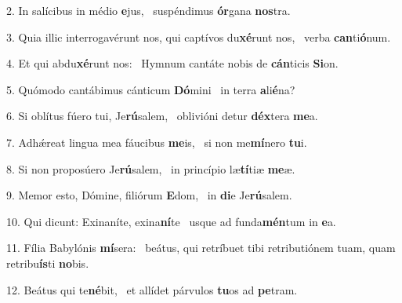 2. In salícibus in médio \textbf{e}jus, \ast\  suspéndimus \textbf{ór}gana \textbf{nos}tra.\

3. Quia illic interrogavérunt nos, qui captívos du\textbf{xé}runt nos, \ast\  verba \textbf{can}ti\textbf{ó}num.\

4. Et qui abdu\textbf{xé}runt nos: \ast\  Hymnum cantáte nobis de \textbf{cán}ticis \textbf{Si}on.\

5. Quómodo cantábimus cánticum \textbf{Dó}mini \ast\  in terra \textbf{a}li\textbf{é}na?\

6. Si oblítus fúero tui, Je\textbf{rú}salem, \ast\  oblivióni detur \textbf{déx}tera \textbf{me}a.\

7. Adhǽreat lingua mea fáucibus \textbf{me}is, \ast\  si non me\textbf{mí}nero \textbf{tu}i.\

8. Si non proposúero Je\textbf{rú}salem, \ast\  in princípio læ\textbf{tí}tiæ \textbf{me}æ.\

9. Memor esto, Dómine, filiórum \textbf{E}dom, \ast\  in \textbf{di}e Je\textbf{rú}salem.\

10. Qui dicunt: Exinaníte, exina\textbf{ní}te \ast\  usque ad funda\textbf{mén}tum in \textbf{e}a.\

11. Fília Babylónis \textbf{mí}sera: \ast\  beátus, qui retríbuet tibi retributiónem tuam, quam retribu\textbf{ís}ti \textbf{no}bis.\

12. Beátus qui te\textbf{né}bit, \ast\  et allídet párvulos \textbf{tu}os ad \textbf{pe}tram.\

